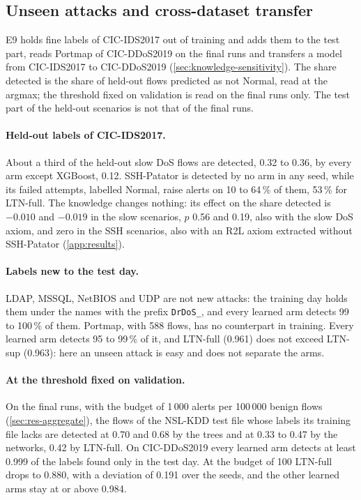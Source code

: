 \subsection{Unseen attacks and cross-dataset transfer}
\label{sec:res-unseen}

E9 holds fine labels of CIC-IDS2017 out of training and adds them to the test part, reads Portmap of CIC-DDoS2019 on
the final runs and transfers a model from CIC-IDS2017 to CIC-DDoS2019 (\cref{sec:knowledge-sensitivity}). The share
detected is the share of held-out flows predicted as not Normal, read at the argmax; the threshold fixed on
validation is read on the final runs only. The test part of the held-out scenarios is not that of the final runs.

\paragraph{Held-out labels of CIC-IDS2017.}
About a third of the held-out slow DoS flows are detected, 0.32 to 0.36, by every arm except XGBoost, 0.12. SSH-Patator
is detected by no arm in any seed, while its failed attempts, labelled Normal, raise alerts on 10 to 64\,\% of them,
53\,\% for LTN-full. The knowledge changes nothing: its effect on the share detected is $-0.010$ and $-0.019$ in the slow
scenarios, $p$ 0.56 and 0.19, also with the slow DoS axiom, and zero in the SSH scenarios, also with an R2L axiom
extracted without SSH-Patator (\cref{app:results}).

\paragraph{Labels new to the test day.}
LDAP, MSSQL, NetBIOS and UDP are not new attacks: the training day holds them under the names with the prefix
\texttt{DrDoS\_}, and every learned arm detects 99 to 100\,\% of them. Portmap, with 588 flows, has no counterpart in
training. Every learned arm detects 95 to 99\,\% of it, and LTN-full (0.961) does not exceed LTN-sup (0.963): here an
unseen attack is easy and does not separate the arms.

\paragraph{At the threshold fixed on validation.}
On the final runs, with the budget of 1\,000 alerts per 100\,000 benign flows (\cref{sec:res-aggregate}), the flows of
the NSL-KDD test file whose labels its training file lacks are detected at 0.70 and 0.68 by the trees and at 0.33 to
0.47 by the networks, 0.42 by LTN-full. On CIC-DDoS2019 every learned arm detects at least 0.999 of the labels found only
in the test day. At the budget of 100 LTN-full drops to 0.880, with a deviation of 0.191 over the seeds, and the other
learned arms stay at or above 0.984.

